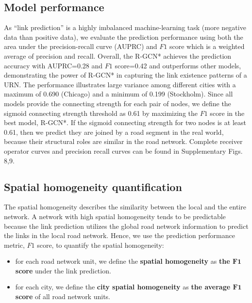 \documentclass[10pt]{wlscirep}
\begin{document}
\subsection*{Model performance}
As “link prediction” is a highly imbalanced machine-learning task (more negative data than positive data), we evaluate the prediction performance using both the area under the precision-recall curve (AUPRC) and $F1$ score which is a weighted average of precision and recall. Overall, the R-GCN* achieves the prediction accuracy with AUPRC=0.28 and $F1$ score=0.42 and outperforms other models, demonstrating the power of R-GCN* in capturing the link existence patterns of a URN. The performance illustrates large variance among different cities with a maximum of 0.690 (Chicago) and a minimum of 0.199 (Stockholm). Since all models provide the connecting strength for each pair of nodes, we define the sigmoid connecting strength threshold as 0.61 by maximizing the $F1$ score in the best model, R-GCN*. If the sigmoid connecting strength for two nodes is at least 0.61, then we predict they are joined by a road segment in the real world, because their structural roles are similar in the road network. Complete receiver operator curves and precision recall curves can be found in Supplementary Figs. 8,9.

\subsection*{Spatial homogeneity quantification}
The spatial homogeneity describes the similarity between the local and the entire network. A network with high spatial homogeneity tends to be predictable because the link prediction utilizes the global road network information to predict the links in the local road network. Hence, we use the prediction performance metric, $F1$ score, to quantify the spatial homogeneity:
\begin{itemize}
\item for each road network unit, we define the \textbf{spatial homogeneity} as \textbf{the $\mathbf{F1}$ score} under the link prediction. \item for each city, we define the \textbf{city spatial homogeneity} as \textbf{the average $\mathbf{F1}$ score} of all road network units.
\end{itemize}
\end{document}

